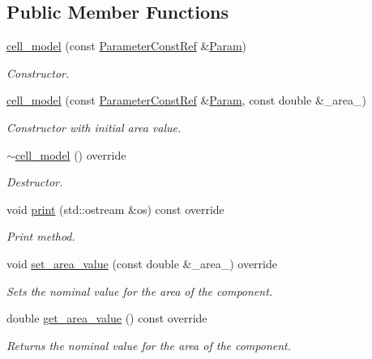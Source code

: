 \subsection*{Public Member Functions}
\begin{DoxyCompactItemize}
\item 
\hyperlink{classcell__model_a398010b6998e15a3b6c97db5f2fb48dd}{cell\+\_\+model} (const \hyperlink{Parameter_8hpp_a37841774a6fcb479b597fdf8955eb4ea}{Parameter\+Const\+Ref} \&\hyperlink{classarea__model_a33c8e77773f9fa818980e4b35e8d8851}{Param})
\begin{DoxyCompactList}\small\item\em Constructor. \end{DoxyCompactList}\item 
\hyperlink{classcell__model_a6ed4667f6abf28a4d0c2f1d261c50d64}{cell\+\_\+model} (const \hyperlink{Parameter_8hpp_a37841774a6fcb479b597fdf8955eb4ea}{Parameter\+Const\+Ref} \&\hyperlink{classarea__model_a33c8e77773f9fa818980e4b35e8d8851}{Param}, const double \&\+\_\+area\+\_\+)
\begin{DoxyCompactList}\small\item\em Constructor with initial area value. \end{DoxyCompactList}\item 
\hyperlink{classcell__model_a24b20b8eba4c8f1da11d94c3b3d5c226}{$\sim$cell\+\_\+model} () override
\begin{DoxyCompactList}\small\item\em Destructor. \end{DoxyCompactList}\item 
void \hyperlink{classcell__model_a3b924669e2a19f7891151c235b83c060}{print} (std\+::ostream \&os) const override
\begin{DoxyCompactList}\small\item\em Print method. \end{DoxyCompactList}\item 
void \hyperlink{classcell__model_a8b10f91f2160785c5b71d22af01eb127}{set\+\_\+area\+\_\+value} (const double \&\+\_\+area\+\_\+) override
\begin{DoxyCompactList}\small\item\em Sets the nominal value for the area of the component. \end{DoxyCompactList}\item 
double \hyperlink{classcell__model_aa96db127d4432fd0a3f4f8db95e29fd8}{get\+\_\+area\+\_\+value} () const override
\begin{DoxyCompactList}\small\item\em Returns the nominal value for the area of the component. \end{DoxyCompactList}\item 

\end{DoxyCompactItemize}
